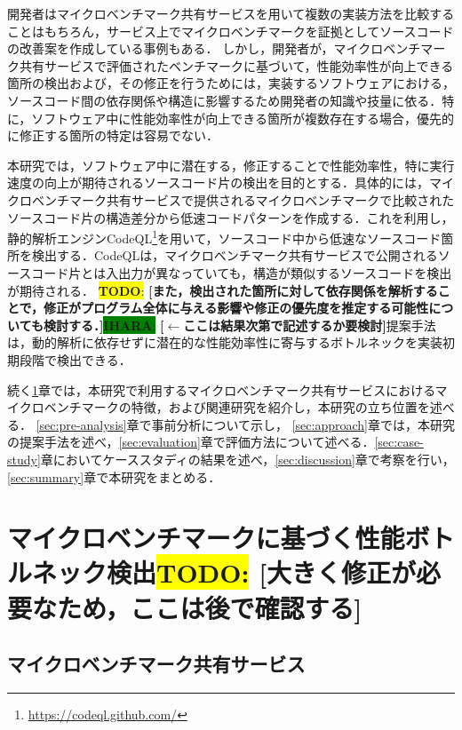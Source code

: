 \documentclass[submit,techrep,noauthor]{ipsj}
\newcommand{\todo}[1]{\colorbox{yellow}{{\bf TODO}:}{\color{red} {\textbf{[#1]}}}}
\newcommand{\ihara}[1]{\colorbox{green}{{\bf IHARA}:}{\color{blue} {\textbf{[#1]}}}}
\begin{document}
開発者はマイクロベンチマーク共有サービスを用いて複数の実装方法を比較することはもちろん，サービス上でマイクロベンチマークを証拠としてソースコードの改善案を作成している事例もある\cite{saiki}．
しかし，開発者が，マイクロベンチマーク共有サービスで評価されたベンチマークに基づいて，性能効率性が向上できる箇所の検出および，その修正を行うためには，実装するソフトウェアにおける，ソースコード間の依存関係や構造に影響するため開発者の知識や技量に依る．特に，ソフトウェア中に性能効率性が向上できる箇所が複数存在する場合，優先的に修正する箇所の特定は容易でない．

本研究では，ソフトウェア中に潜在する，修正することで性能効率性，特に実行速度の向上が期待されるソースコード片の検出を目的とする．具体的には，マイクロベンチマーク共有サービスで提供されるマイクロベンチマークで比較されたソースコード片の構造差分から低速コードパターンを作成する．これを利用し，静的解析エンジンCodeQL\footnote{\url{https://codeql.github.com/}}\cite{ql}を用いて，ソースコード中から低速なソースコード箇所を検出する．CodeQLは，マイクロベンチマーク共有サービスで公開されるソースコード片とは入出力が異なっていても，構造が類似するソースコードを検出が期待される．
\todo{また，検出された箇所に対して依存関係を解析することで，修正がプログラム全体に与える影響や修正の優先度を推定する可能性についても検討する．}\ihara{$\leftarrow$ここは結果次第で記述するか要検討}提案手法は，動的解析に依存せずに潜在的な性能効率性に寄与するボトルネックを実装初期段階で検出できる．

続く\ref{sec:background}章では，本研究で利用するマイクロベンチマーク共有サービスにおけるマイクロベンチマークの特徴，および関連研究を紹介し，本研究の立ち位置を述べる． \ref{sec:pre-analysis}章で事前分析について示し， \ref{sec:approach}章では，本研究の提案手法を述べ，\ref{sec:evaluation}章で評価方法について述べる．\ref{sec:case-study}章においてケーススタディの結果を述べ，\ref{sec:discussion}章で考察を行い，\ref{sec:summary}章で本研究をまとめる． 


\section{マイクロベンチマークに基づく性能ボトルネック検出\todo{大きく修正が必要なため，ここは後で確認する}}
\label{sec:background}

\subsection{マイクロベンチマーク共有サービス}
\end{document}
